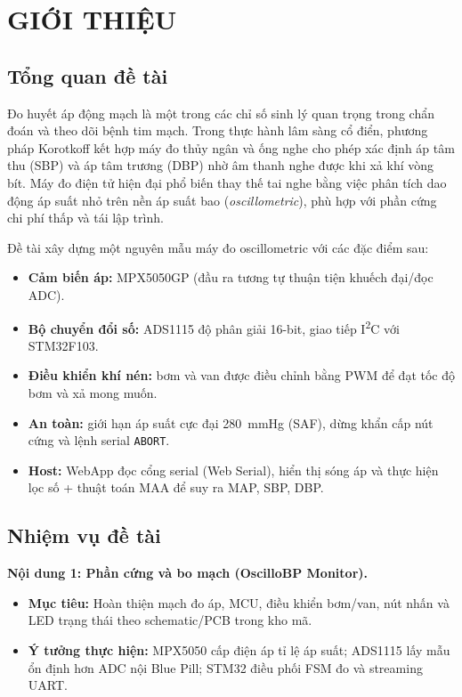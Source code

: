 \pagestyle{fancy}
\chapter{GIỚI THIỆU}

\section{Tổng quan đề tài}
Đo huyết áp động mạch là một trong các chỉ số sinh lý quan trọng trong chẩn đoán và theo dõi bệnh tim mạch. Trong thực hành lâm sàng cổ điển, phương pháp Korotkoff kết hợp máy đo thủy ngân và ống nghe cho phép xác định áp tâm thu (SBP) và áp tâm trương (DBP) nhờ âm thanh nghe được khi xả khí vòng bít. Máy đo điện tử hiện đại phổ biến thay thế tai nghe bằng việc phân tích dao động áp suất nhỏ trên nền áp suất bao (\textit{oscillometric}), phù hợp với phần cứng chi phí thấp và tái lập trình.

Đề tài xây dựng một nguyên mẫu máy đo oscillometric với các đặc điểm sau:
\begin{itemize}\itemsep0pt \parskip0pt 
	\item \textbf{Cảm biến áp:} MPX5050GP (đầu ra tương tự thuận tiện khuếch đại/đọc ADC).
	\item \textbf{Bộ chuyển đổi số:} ADS1115 độ phân giải 16-bit, giao tiếp I\textsuperscript{2}C với STM32F103.
	\item \textbf{Điều khiển khí nén:} bơm và van được điều chỉnh bằng PWM để đạt tốc độ bơm và xả mong muốn.
	\item \textbf{An toàn:} giới hạn áp suất cực đại 280~mmHg (SAF), dừng khẩn cấp nút cứng và lệnh serial \texttt{ABORT}.
	\item \textbf{Host:} WebApp đọc cổng serial (Web Serial), hiển thị sóng áp và thực hiện lọc số + thuật toán MAA để suy ra MAP, SBP, DBP.
\end{itemize}

\section{Nhiệm vụ đề tài}
\noindent\textbf{Nội dung 1: Phần cứng và bo mạch (OscilloBP Monitor).}\\
\vspace{-0.6cm}
\begin{itemize}\itemsep0pt \parskip0pt 
	\item \textbf{Mục tiêu:} Hoàn thiện mạch đo áp, MCU, điều khiển bơm/van, nút nhấn và LED trạng thái theo schematic/PCB trong kho mã.
	\item \textbf{Ý tưởng thực hiện:} MPX5050 cấp điện áp tỉ lệ áp suất; ADS1115 lấy mẫu ổn định hơn ADC nội Blue Pill; STM32 điều phối FSM đo và streaming UART.
\end{itemize}
\vspace{-0.2cm}

